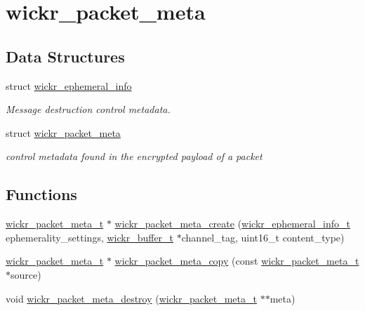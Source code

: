 \hypertarget{group__wickr__packet__meta}{}\section{wickr\+\_\+packet\+\_\+meta}
\label{group__wickr__packet__meta}
\subsection*{Data Structures}
\begin{DoxyCompactItemize}
\item 
struct \mbox{\hyperlink{structwickr__ephemeral__info}{wickr\+\_\+ephemeral\+\_\+info}}
\begin{DoxyCompactList}\small\item\em Message destruction control metadata. \end{DoxyCompactList}\item 
struct \mbox{\hyperlink{structwickr__packet__meta}{wickr\+\_\+packet\+\_\+meta}}
\begin{DoxyCompactList}\small\item\em control metadata found in the encrypted payload of a packet \end{DoxyCompactList}\end{DoxyCompactItemize}
\subsection*{Functions}
\begin{DoxyCompactItemize}
\item 
\mbox{\hyperlink{structwickr__packet__meta}{wickr\+\_\+packet\+\_\+meta\+\_\+t}} $\ast$ \mbox{\hyperlink{group__wickr__packet__meta_ga146144d74da12c1fff766462fe7fa661}{wickr\+\_\+packet\+\_\+meta\+\_\+create}} (\mbox{\hyperlink{structwickr__ephemeral__info}{wickr\+\_\+ephemeral\+\_\+info\+\_\+t}} ephemerality\+\_\+settings, \mbox{\hyperlink{structwickr__buffer}{wickr\+\_\+buffer\+\_\+t}} $\ast$channel\+\_\+tag, uint16\+\_\+t content\+\_\+type)
\item 
\mbox{\hyperlink{structwickr__packet__meta}{wickr\+\_\+packet\+\_\+meta\+\_\+t}} $\ast$ \mbox{\hyperlink{group__wickr__packet__meta_ga1bb5a0f2a49069679b174b3e6521fe9b}{wickr\+\_\+packet\+\_\+meta\+\_\+copy}} (const \mbox{\hyperlink{structwickr__packet__meta}{wickr\+\_\+packet\+\_\+meta\+\_\+t}} $\ast$source)
\item 
void \mbox{\hyperlink{group__wickr__packet__meta_gad165ad670da761478cf5f8f91223c1d3}{wickr\+\_\+packet\+\_\+meta\+\_\+destroy}} (\mbox{\hyperlink{structwickr__packet__meta}{wickr\+\_\+packet\+\_\+meta\+\_\+t}} $\ast$$\ast$meta)
\end{DoxyCompactItemize}


